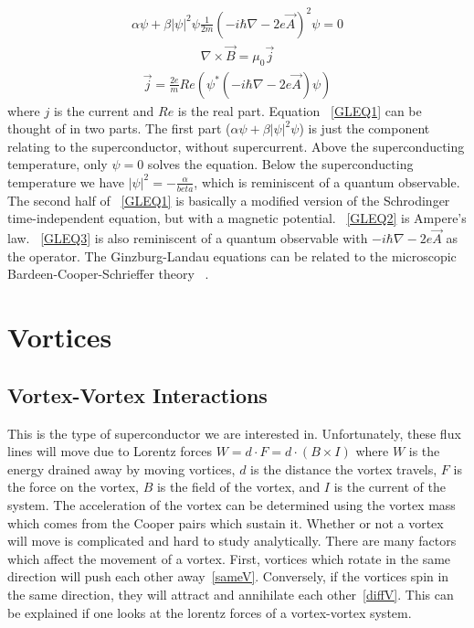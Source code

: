 \begin{eqnarray}
\alpha \psi + \beta |\psi|^2 \psi \frac {1} {2m} (-i \hbar \nabla - 2 e \overrightarrow A)^2 \psi = 0
\label{GLEQ1}
\end{eqnarray}
\begin{eqnarray}
\nabla \times \overrightarrow B = \mu_0 \overrightarrow j
\label{GLEQ2}
\end{eqnarray}
\begin{eqnarray}
\overrightarrow j = \frac {2e} {m} Re(\psi^* (-i \hbar \nabla - 2 e \overrightarrow A) \psi)
\label{GLEQ3}
\end{eqnarray}
where $j$ is the current and $Re$ is the real part. Equation ~\ref{GLEQ1} can be thought of in two parts. The first part ($\alpha \psi + \beta |\psi|^2 \psi $) is just the component relating to the superconductor, without supercurrent. Above the superconducting temperature, only $\psi = 0$ solves the equation. Below the superconducting temperature we have $|\psi|^2 = -\frac {\alpha} {beta}$, which is reminiscent of a quantum observable. The second half of ~\ref{GLEQ1} is basically a modified version of the Schrodinger time-independent equation, but with a magnetic potential. ~\ref{GLEQ2} is Ampere's law. ~\ref{GLEQ3} is also reminiscent of a quantum observable with $ -i \hbar \nabla - 2e \overrightarrow A$ as the operator. The Ginzburg-Landau equations can be related to the microscopic Bardeen-Cooper-Schrieffer theory ~\cite{Sadovskyy14}. 




\section{Vortices}

\subsection{Vortex-Vortex Interactions}
	This is the type of superconductor we are interested in. Unfortunately, these flux lines will move due to Lorentz forces $W = d \cdot F = d \cdot (B \times I)$ where $W$ is the energy drained away by moving vortices, $d$ is the distance the vortex travels, $F$ is the force on the vortex, $B$ is the field of the vortex, and $I$ is the current of the system. The acceleration of the vortex can be determined using the vortex mass which comes from the Cooper pairs which sustain it. Whether or not a vortex will move is complicated and hard to study analytically. There are many factors which affect the movement of a vortex. First, vortices which rotate in the same direction will push each other away~\ref{sameV}. Conversely, if the vortices spin in the same direction, they will attract and annihilate each other~\ref{diffV}. This can be explained if one looks at the lorentz forces of a vortex-vortex system.

